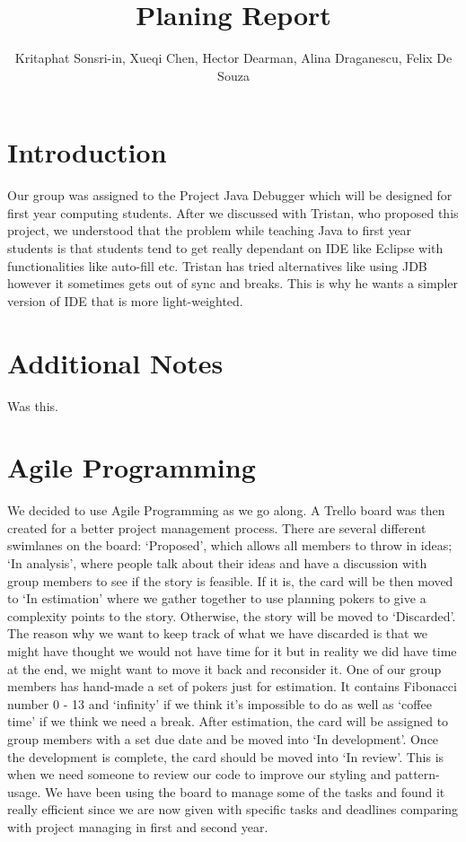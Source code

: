 \documentclass[11pt]{article}
\begin{document}
\title{Planing Report}
\author{Kritaphat Sonsri-in, Xueqi Chen, Hector Dearman, Alina Draganescu, Felix De Souza}

\maketitle

\section{Introduction}

Our group was assigned to the Project Java Debugger which will be designed for first year computing students. After we discussed with Tristan, who proposed this project, we understood that the problem while teaching Java to first year students is that students tend to get really dependant on IDE like Eclipse with functionalities like auto-fill etc. Tristan has tried alternatives like using JDB however it sometimes gets out of sync and breaks. This is why he wants a simpler version of IDE that is more light-weighted. 

\section{Additional Notes}

Was this.

\section{Agile Programming}
We decided to use Agile Programming as we go along. A Trello board was then created for a better project management process. There are several different swimlanes on the board: ‘Proposed’, which allows all members to throw in ideas; ‘In analysis’, where people talk about their ideas and have a discussion with group members to see if the story is feasible. If it is, the card will be then moved to ‘In estimation’ where we gather together to use planning pokers to give a complexity points to the story. Otherwise, the story will be moved to ‘Discarded’. The reason why we want to keep track of what we have discarded is that we might have thought we would not have time for it but in reality we did have time at the end, we might want to move it back and reconsider it. One of our group members has hand-made a set of pokers just for estimation. It contains Fibonacci number 0 - 13 and ‘infinity’ if we think it’s impossible to do as well as ‘coffee time’ if we think we need a break. After estimation, the card will be assigned to group members with a set due date and be moved into ‘In development’. Once the development is complete, the card should be moved into ‘In review’. This is when we need someone to review our code to improve our styling and pattern-usage. We have been using the board to manage some of the tasks and found it really efficient since we are now given with specific tasks and deadlines comparing with project managing in first and second year.
\end{document}
